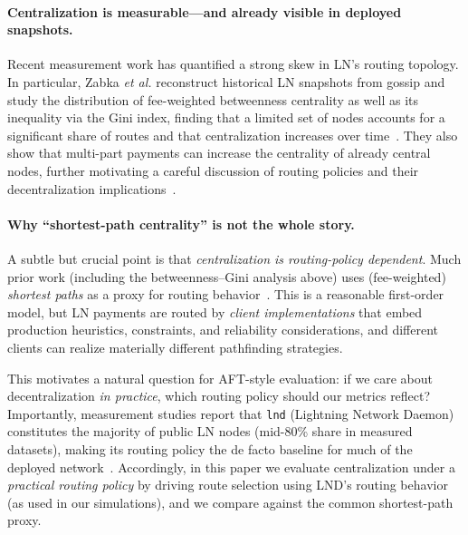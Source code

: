 \documentclass{article}
\begin{document}
\paragraph{Centralization is measurable---and already visible in deployed snapshots.}
Recent measurement work has quantified a strong skew in LN's routing topology. In particular, Zabka \emph{et al.} reconstruct historical LN snapshots from gossip and study the distribution of fee-weighted betweenness centrality as well as its inequality via the Gini index, finding that a limited set of nodes accounts for a significant share of routes and that centralization increases over time~\cite{zabka2024centrality}. They also show that multi-part payments can increase the centrality of already central nodes, further motivating a careful discussion of routing policies and their decentralization implications~\cite{zabka2024centrality}.

\paragraph{Why ``shortest-path centrality'' is not the whole story.}
A subtle but crucial point is that \emph{centralization is routing-policy dependent}. Much prior work (including the betweenness--Gini analysis above) uses (fee-weighted) \emph{shortest paths} as a proxy for routing behavior~\cite{zabka2024centrality}. This is a reasonable first-order model, but LN payments are routed by \emph{client implementations} that embed production heuristics, constraints, and reliability considerations, and different clients can realize materially different pathfinding strategies.

This motivates a natural question for AFT-style evaluation: if we care about decentralization \emph{in practice}, which routing policy should our metrics reflect? Importantly, measurement studies report that \texttt{lnd} (Lightning Network Daemon) constitutes the majority of public LN nodes (mid-80\% share in measured datasets), making its routing policy the de facto baseline for much of the deployed network~\cite{zabka2022empirical,zabka2024centrality}. Accordingly, in this paper we evaluate centralization under a \emph{practical routing policy} by driving route selection using LND's routing behavior (as used in our simulations), and we compare against the common shortest-path proxy.
\end{document}

